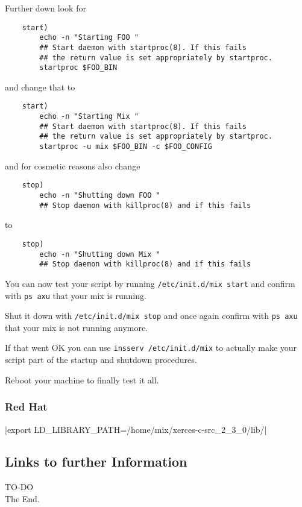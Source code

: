 \documentclass{article}
\begin{document}
Further down look for 

\begin{verbatim}
    start)
        echo -n "Starting FOO "
        ## Start daemon with startproc(8). If this fails
        ## the return value is set appropriately by startproc.
        startproc $FOO_BIN

\end{verbatim}

and change that to

\begin{verbatim}
    start)
        echo -n "Starting Mix "
        ## Start daemon with startproc(8). If this fails
        ## the return value is set appropriately by startproc.
        startproc -u mix $FOO_BIN -c $FOO_CONFIG

\end{verbatim}

and for cosmetic reasons also change

\begin{verbatim}
    stop)
        echo -n "Shutting down FOO "
        ## Stop daemon with killproc(8) and if this fails
\end{verbatim}

to

\begin{verbatim}
    stop)
        echo -n "Shutting down Mix "
        ## Stop daemon with killproc(8) and if this fails
\end{verbatim}

You can now test your script by running \texttt{/etc/init.d/mix start} and
confirm with \texttt{ps axu} that your mix is running.

Shut it down with \texttt{/etc/init.d/mix stop} and once again
confirm with \texttt{ps axu} that your mix is not running anymore.

If that went OK you can use \texttt{insserv /etc/init.d/mix} to 
actually make your script part of the startup and shutdown procedures.

Reboot your machine to finally test it all.


\subsubsection{Red Hat}


\verbatim|export LD_LIBRARY_PATH=/home/mix/xerces-c-src_2_3_0/lib/|


% ---------------------------------------------------------------------

\subsection{Links to further Information}


TO-DO\\

The End.
\end{document}
